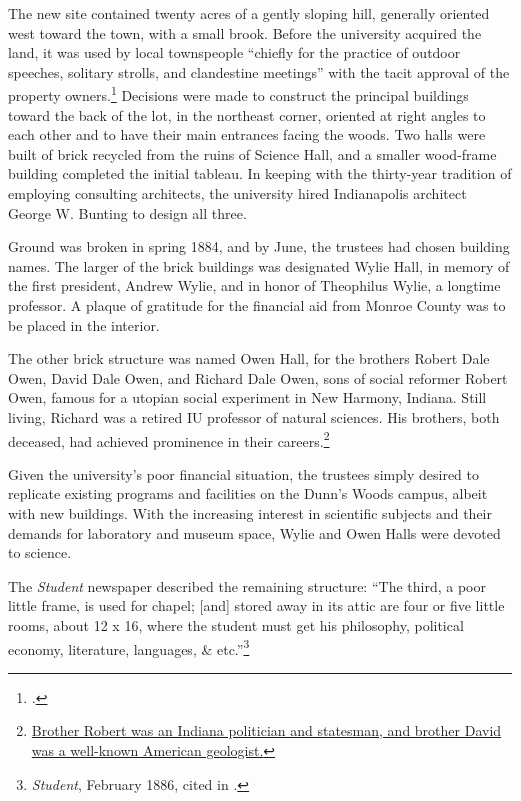 \documentclass[
  american,
  letterpaper,
]{scrreprt}
\begin{document}
The new site contained twenty acres of a gently sloping hill, generally
oriented west toward the town, with a small brook. Before the university
acquired the land, it was used by local townspeople ``chiefly for the
practice of outdoor speeches, solitary strolls, and clandestine
meetings'' with the tacit approval of the property owners.\footnote{.} Decisions were made to construct the principal
buildings toward the back of the lot, in the northeast corner, oriented
at right angles to each other and to have their main entrances facing
the woods. Two halls were built of brick recycled from the ruins of
Science Hall, and a smaller wood-frame building completed the initial
tableau. In keeping with the thirty-year tradition of employing
consulting architects, the university hired Indianapolis architect
George W. Bunting to design all three.

Ground was broken in spring 1884, and by June, the trustees had chosen
building names. The larger of the brick buildings was designated Wylie
Hall, in memory of the first president, Andrew Wylie, and in honor of
Theophilus Wylie, a longtime professor. A plaque of gratitude for the
financial aid from Monroe County was to be placed in the interior.

The other brick structure was named Owen Hall, for the brothers Robert
Dale Owen, David Dale Owen, and Richard Dale Owen, sons of social
reformer Robert Owen, famous for a utopian social experiment in New
Harmony, Indiana. Still living, Richard was a retired IU professor of
natural sciences. His brothers, both deceased, had achieved prominence
in their careers.\footnote{\href{https://purl.dlib.indiana.edu/iudl/archives/iubot/1884-06-04}{Brother
  Robert was an Indiana politician and statesman, and brother David was
  a well-known American geologist.}}

Given the university's poor financial situation, the trustees simply
desired to replicate existing programs and facilities on the Dunn's
Woods campus, albeit with new buildings. With the increasing interest in
scientific subjects and their demands for laboratory and museum space,
Wylie and Owen Halls were devoted to science.

The \emph{Student} newspaper described the remaining structure: ``The
third, a poor little frame, is used for chapel; {[}and{]} stored away in
its attic are four or five little rooms, about 12 x 16, where the
student must get his philosophy, political economy, literature,
languages, \& etc.''\footnote{\emph{Student}, February 1886, cited in
  .}
\end{document}
